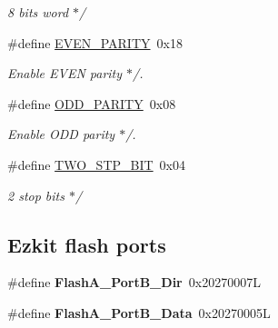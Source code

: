 \begin{DoxyCompactItemize}
\begin{DoxyCompactList}\small\item\em 8 bits word $\ast$/ \end{DoxyCompactList}\item 
\mbox{\label{group__RTEMSBSPsBfinEZKit533_ga30a963ff1432e4cfbdd83e74045ef142}} 
\#define \mbox{\hyperlink{group__RTEMSBSPsBfinEZKit533_ga30a963ff1432e4cfbdd83e74045ef142}{E\+V\+E\+N\+\_\+\+P\+A\+R\+I\+TY}}~0x18
\begin{DoxyCompactList}\small\item\em Enable E\+V\+EN parity $\ast$/. \end{DoxyCompactList}\item 
\mbox{\label{group__RTEMSBSPsBfinEZKit533_ga898d7631f24dd6b1deebf808a2214ea2}} 
\#define \mbox{\hyperlink{group__RTEMSBSPsBfinEZKit533_ga898d7631f24dd6b1deebf808a2214ea2}{O\+D\+D\+\_\+\+P\+A\+R\+I\+TY}}~0x08
\begin{DoxyCompactList}\small\item\em Enable O\+DD parity $\ast$/. \end{DoxyCompactList}\item 
\mbox{\label{group__RTEMSBSPsBfinEZKit533_gab03ed74bfd7b18c70fa22835d779997b}} 
\#define \mbox{\hyperlink{group__RTEMSBSPsBfinEZKit533_gab03ed74bfd7b18c70fa22835d779997b}{T\+W\+O\+\_\+\+S\+T\+P\+\_\+\+B\+IT}}~0x04
\begin{DoxyCompactList}\small\item\em 2 stop bits $\ast$/ \end{DoxyCompactList}\end{DoxyCompactItemize}
\subsection*{Ezkit flash ports}
\begin{DoxyCompactItemize}
\item 
\mbox{\label{group__RTEMSBSPsBfinEZKit533_gaea98f8b724566ca6b92bf8863262af80}} 
\#define {\bfseries Flash\+A\+\_\+\+Port\+B\+\_\+\+Dir}~0x20270007L
\item 
\mbox{\label{group__RTEMSBSPsBfinEZKit533_ga217fb5ec2c28003d42dff35f8295ebdd}} 
\#define {\bfseries Flash\+A\+\_\+\+Port\+B\+\_\+\+Data}~0x20270005L
\end{DoxyCompactItemize}
